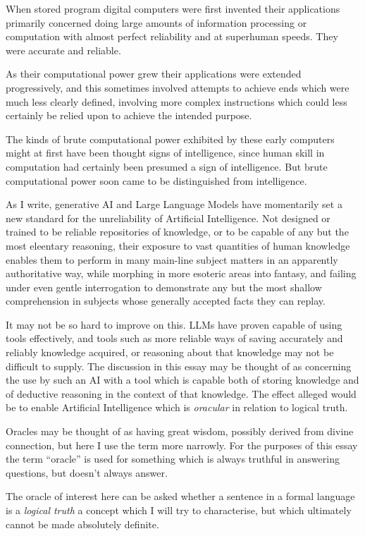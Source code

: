 \documentclass[10pt,titlepage]{book}
\begin{document}
When stored program digital computers were first invented their applications primarily concerned doing large amounts of information processing or computation with almost perfect reliability and at superhuman speeds.
They were accurate and reliable.

As their computational power grew their applications were extended progressively, and this sometimes involved attempts to achieve ends which were much less clearly defined, involving more complex instructions which could less certainly be relied upon to achieve the intended purpose.

The kinds of brute computational power exhibited by these early computers might at first have been thought signs of intelligence, since human skill in computation had certainly been presumed a sign of intelligence.
But brute computational power soon came to be distinguished from intelligence.

As I write, generative AI and Large Language Models have momentarily set a new standard for the unreliability of Artificial Intelligence.
Not designed or trained to be reliable repositories of knowledge, or to be capable of any but the most eleentary reasoning, their exposure to vast quantities of human knowledge enables them to perform in many main-line subject matters in an apparently authoritative way, while morphing in more esoteric areas into fantasy, and failing under even gentle interrogation to demonstrate any but the most shallow comprehension in subjects whose generally accepted facts they can replay.

It may not be so hard to improve on this.
LLMs have proven capable of using tools effectively, and tools such as more reliable ways of saving accurately and reliably knowledge acquired, or reasoning about that knowledge may not be difficult to supply.
The discussion in this essay may be thought of as concerning the use by such an AI with a tool which is capable both of storing knowledge and of deductive reasoning in the context of that knowledge.
The effect alleged would be to enable Artificial Intelligence which is \emph{oracular} in relation to logical truth.

Oracles may be thought of as having great wisdom, possibly derived from divine connection, but here I use the term more narrowly.
For the purposes of this essay the term ``oracle'' is used for something which is always truthful in answering questions, but doesn't always answer.

The oracle of interest here can be asked whether a sentence in a formal language is a \emph{logical truth} a concept which I will try to characterise, but which ultimately cannot be made absolutely definite.
\end{document}
